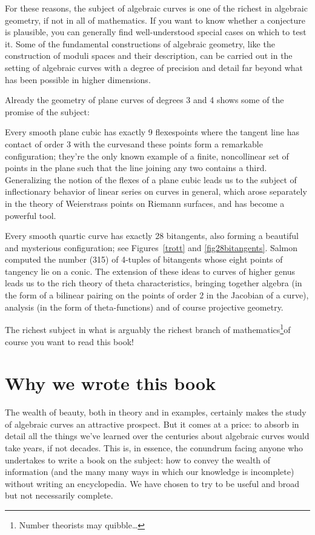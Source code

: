 For these reasons, the subject of algebraic curves is one of the richest in algebraic geometry, if not in all of mathematics. If you want to know whether a conjecture is plausible, you can generally find well-understood special cases on which to test it. Some of the fundamental constructions of algebraic geometry, like the construction of moduli spaces and their description, can be carried out in the setting of algebraic curves with a degree of precision and detail far beyond what has been possible in higher dimensions. 

Already the geometry of plane curves of degrees 3 and 4 shows some of the promise of the subject:

Every smooth plane cubic has exactly 9 flexes\emdash points where the
%
tangent line has contact of order 3 with the curves\emdash and these
points form a remarkable configuration; they're the only known example
of a finite, noncollinear set of points in the plane such that the line
joining any two contains a third. Generalizing the notion of the
flexes of a plane cubic leads us to the subject of inflectionary
behavior of linear series on curves in general, which arose separately
in the theory of Weierstrass points on Riemann surfaces, and  has
become a powerful tool.
%

Every smooth quartic curve has exactly 28 bitangents, also forming a beautiful and mysterious configuration; see 
%
%
Figures~\ref{trott} and \ref{fig28bitangents}. 
Salmon
\citeyear[p.\,197]{Salmon1852}
computed the number (315) of 4-tuples of bitangents whose eight points
of tangency lie on a conic. The extension of these ideas to curves of
higher genus leads us to the rich theory of theta characteristics,
%
bringing together algebra (in the form of a bilinear pairing on the
points of order 2 in the Jacobian of a curve), analysis (in the form
of theta-functions) and of course projective geometry.

The richest subject in what is arguably the richest branch of
mathematics\footnote{Number theorists may quibble\dots}\emdash of
course you want to read this book!  

\section*{Why we wrote this book}

The wealth of beauty, both in theory and in examples, certainly makes the study of algebraic curves an attractive prospect. But it comes at a price: to absorb in detail all the things we've learned over the centuries about algebraic curves would take years, if not decades. This is, in essence, the conundrum facing anyone who undertakes to write a book on the subject: how to convey the wealth of information  (and the many many ways in which our knowledge is incomplete) without writing an encyclopedia. We have chosen to try to be useful and broad but not necessarily complete. 

